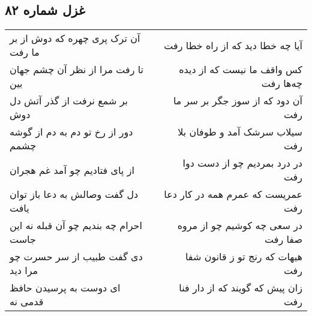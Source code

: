 \begin{center}
\section*{غزل شماره ۸۲}
\label{sec:sh082}
\begin{longtable}{l p{0.5cm} r}
آن ترک پری چهره که دوش از بر ما رفت
&&
آیا چه خطا دید که از راه خطا رفت
\\
تا رفت مرا از نظر آن چشم جهان بین
&&
کس واقف ما نیست که از دیده چه‌ها رفت
\\
بر شمع نرفت از گذر آتش دل دوش
&&
آن دود که از سوز جگر بر سر ما رفت
\\
دور از رخ تو دم به دم از گوشه چشمم
&&
سیلاب سرشک آمد و طوفان بلا رفت
\\
از پای فتادیم چو آمد غم هجران
&&
در درد بمردیم چو از دست دوا رفت
\\
دل گفت وصالش به دعا باز توان یافت
&&
عمریست که عمرم همه در کار دعا رفت
\\
احرام چه بندیم چو آن قبله نه این جاست
&&
در سعی چه کوشیم چو از مروه صفا رفت
\\
دی گفت طبیب از سر حسرت چو مرا دید
&&
هیهات که رنج تو ز قانون شفا رفت
\\
ای دوست به پرسیدن حافظ قدمی نه
&&
زان پیش که گویند که از دار فنا رفت
\\
\end{longtable}
\end{center}
